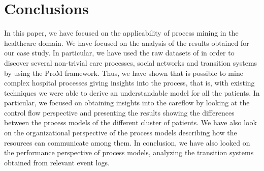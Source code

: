 \section{Conclusions} \label{conclusions}
In this paper, we have focused on the applicability of process mining in the healthcare domain. We have focused on the analysis of the results obtained for our case study. In particular, we have used the raw datasets of \hospital in order to discover several non-trivial care processes, social networks and transition systems by using the ProM framework. Thus, we have shown that is possible to mine complex hospital processes giving insights into the process, that is, with existing techniques we were able to derive an understandable model for all the patients. In particular, we focused on obtaining insights into the careflow by looking at
the control flow perspective and presenting the results showing the differences between the process models of the different cluster of patients. We have also look on the organizational perspective of the process models describing how the resources can communicate among them. In conclusion, we have also looked on the performance perspective of process models, analyzing the transition systems obtained from relevant event logs.

